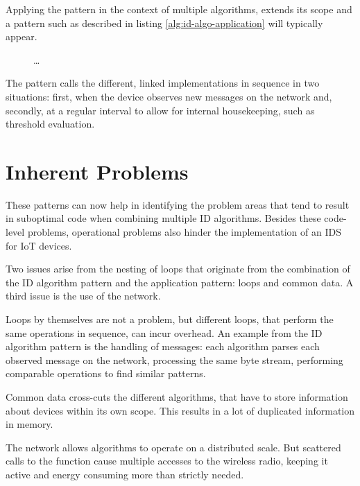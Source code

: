 \documentclass[conference]{IEEEtran}
\begin{document}
Applying the pattern in the context of multiple algorithms, extends its scope
and a pattern such as described in listing \ref{alg:id-algo-application} will
typically appear.

\begin{figure}[ht]
\begin{algorithmic}[1]
   
    \State {}
  \EndFor
  \State \dots
    \State {}
  \EndFor
\end{algorithmic}
\end{figure}

The pattern calls the different, linked implementations in sequence in two
situations: first, when the device observes new messages on the network and,
secondly, at a regular interval to allow for internal housekeeping, such as
threshold evaluation.

\section{Inherent Problems}
\label{problems}

These patterns can now help in identifying the problem areas that tend to
result in suboptimal code when combining multiple ID algorithms. Besides these
code-level problems, operational problems also hinder the implementation of an
IDS for IoT devices.

Two issues arise from the nesting of loops that originate from the combination
of the ID algorithm pattern and the application pattern: loops and common data.
A third issue is the use of the network.

\begin{LaTeXdescription}

  \item[Loops] by themselves are not a problem, but different loops, that
  perform the same operations in sequence, can incur overhead. An example from
  the ID algorithm pattern is the handling of messages: each algorithm parses
  each observed message on the network, processing the same byte stream,
  performing comparable operations to find similar patterns.

  \item[Common data] cross-cuts the different algorithms, that have to store
  information about devices within its own scope. This results in a lot of
  duplicated information in memory.

  \item[The network] allows algorithms to operate on a distributed scale. But
  scattered calls to the  function cause multiple accesses to the
  wireless radio, keeping it active and energy consuming more than strictly
  needed.

\end{LaTeXdescription}
\end{document}
